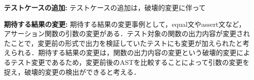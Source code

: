 \documentclass[uplatex,dvipdfmx,a4paper,twocolumn,base=11pt,jbase=11pt,ja=standard]{bxjsarticle}  %
\begin{document}

\noindent\textbf{テストケースの追加: } テストケースの追加は，破壊的変更に伴って

    
\noindent\textbf{期待する結果の変更: }期待する結果の変更事例として，equal文やassert文など，アサーション関数の引数の変更がある．テスト対象の関数の出力内容が変更されたことで，変更前の形式で出力を検証していたテストにも変更が加えられたと考えられる．期待する結果の変更は，関数の出力内容の変更という破壊的変更によるテスト変更であるため，変更前後のASTを比較することによって引数の変更を捉え，破壊的変更の検出ができると考える．


\end{document}
